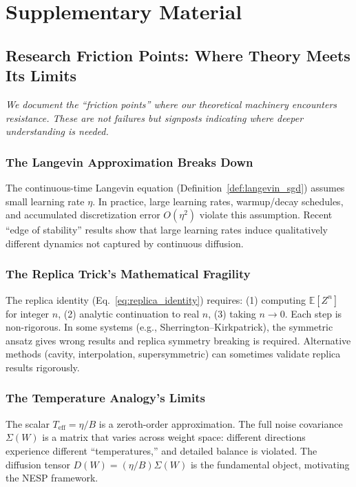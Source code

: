 \documentclass[
  journal=largetwo,
  simfonts=false,
  year=2025,
  volume=37,
]{cup-journal}
\begin{document}
\appendix
\section{Supplementary Material}\label{app:supplementary}

\subsection{Research Friction Points: Where Theory Meets Its Limits}\label{app:friction_points}

\textit{We document the ``friction points'' where our theoretical machinery encounters resistance. These are not failures but signposts indicating where deeper understanding is needed.}

\subsubsection{The Langevin Approximation Breaks Down}
The continuous-time Langevin equation (Definition~\ref{def:langevin_sgd}) assumes small learning rate $\eta$. In practice, large learning rates, warmup/decay schedules, and accumulated discretization error $O(\eta^2)$ violate this assumption. Recent ``edge of stability'' results \cite{cohen2021gradient} show that large learning rates induce qualitatively different dynamics not captured by continuous diffusion.

\subsubsection{The Replica Trick's Mathematical Fragility}
The replica identity (Eq.~\eqref{eq:replica_identity}) requires: (1) computing $\mathbb{E}[Z^n]$ for integer $n$, (2) analytic continuation to real $n$, (3) taking $n \to 0$. Each step is non-rigorous. In some systems (e.g., Sherrington--Kirkpatrick), the symmetric ansatz gives wrong results and replica symmetry breaking is required. Alternative methods (cavity, interpolation, supersymmetric) can sometimes validate replica results rigorously.

\subsubsection{The Temperature Analogy's Limits}
The scalar $T_{\text{eff}} = \eta/B$ is a zeroth-order approximation. The full noise covariance $\Sigma(W)$ is a matrix that varies across weight space: different directions experience different ``temperatures,'' and detailed balance is violated. The diffusion tensor $D(W) = (\eta/B)\Sigma(W)$ is the fundamental object, motivating the NESP framework.
\end{document}
